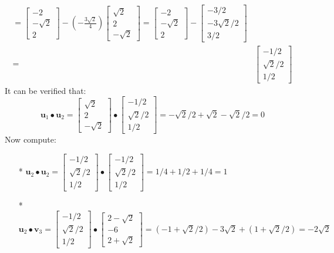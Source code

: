 \documentclass{article}
\begin{document}
\begin{description}
\begin{align*}
= \begin{bmatrix} -2 \\ -\sqrt{2} \\ 2 \end{bmatrix} - (-\frac{3\sqrt{2}}{4})\begin{bmatrix} \sqrt{2} \\ 2 \\ -\sqrt{2} \end{bmatrix} 
= \begin{bmatrix} -2 \\ -\sqrt{2} \\ 2 \end{bmatrix} - \begin{bmatrix} -3/2 \\ -3\sqrt{2}/2 \\ 3/2 \end{bmatrix} \\
= & \begin{bmatrix} -1/2 \\ \sqrt{2}/2 \\ 1/2 \end{bmatrix} 
\end{align*}
It can be verified that:
\[\mathbf{u}_1 \bullet \mathbf{u}_2 = \begin{bmatrix} \sqrt{2} \\ 2 \\ -\sqrt{2} \end{bmatrix} \bullet \begin{bmatrix} -1/2 \\ \sqrt{2}/2 \\ 1/2 \end{bmatrix}  = -\sqrt{2}/2 + \sqrt{2} - \sqrt{2}/2 = 0\]
Now compute:
\begin{itemize}
\item[*] \(\mathbf{u}_2 \bullet \mathbf{u}_2 = \begin{bmatrix} -1/2 \\ \sqrt{2}/2 \\ 1/2 \end{bmatrix} \bullet \begin{bmatrix} -1/2 \\ \sqrt{2}/2 \\ 1/2 \end{bmatrix} = 1/4 + 1/2 + 1/4 = 1\)
\item[*] \(\mathbf{u}_2 \bullet \mathbf{v}_3 = \begin{bmatrix} -1/2 \\ \sqrt{2}/2 \\ 1/2 \end{bmatrix} \bullet \begin{bmatrix} 2 - \sqrt{2} \\ -6 \\ 2 + \sqrt{2} \end{bmatrix} = (-1 + \sqrt{2}/2) - 3\sqrt{2} + (1 + \sqrt{2}/2) = -2\sqrt{2}\)

\end{itemize}
\end{description}
\end{document}
